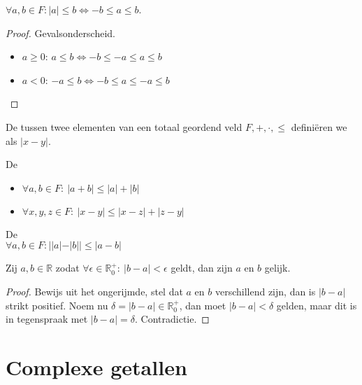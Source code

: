 \documentclass[main.tex]{subfiles}
\begin{document}
\begin{pr}
  $\forall a,b\in F: |a| \le b \Leftrightarrow -b \le a \le b$.

  \begin{proof}
    Gevalsonderscheid.
    \begin{itemize}
    \item $a \ge 0$: $a \le b \Leftrightarrow -b \le -a \le a \le b$
    \item $a <0$: $-a \le b \Leftrightarrow -b \le a \le -a \le b$
    \end{itemize}
  \end{proof}
\end{pr}

\begin{de}
  De  tussen twee elementen van een totaal geordend veld $F,+,\cdot,\le$ defini\"eren we als $|x-y|$.
\end{de}

\begin{pr}
  De \\
  \begin{itemize}
  \item $\forall a,b\in F:\ |a+b| \le |a| + |b|$
  \item $\forall x,y,z\in F:\ |x-y| \le |x-z| + |z-y|$
  \end{itemize}
\end{pr}

\begin{pr}
  De \\
  $\forall a,b\in F: ||a|-|b|| \le |a-b|$
\end{pr}

\begin{st}
  Zij $a,b\in\mathbb{R}$ zodat $\forall \epsilon\in\mathbb{R}_{0}^{+}:\ |b-a| < \epsilon$ geldt, dan zijn $a$ en $b$ gelijk.

  \begin{proof}
    Bewijs uit het ongerijmde, stel dat $a$ en $b$ verschillend zijn, dan is $|b-a|$ strikt positief.
    Noem nu $\delta = |b-a| \in \mathbb{R}_{0}^{+}$, dan moet $|b-a|< \delta$ gelden, maar dit is in tegenspraak met $|b-a| = \delta$.
    Contradictie.
  \end{proof}
\end{st}

\section{Complexe getallen}
\label{sec:complexe-getallen}
\end{document}
